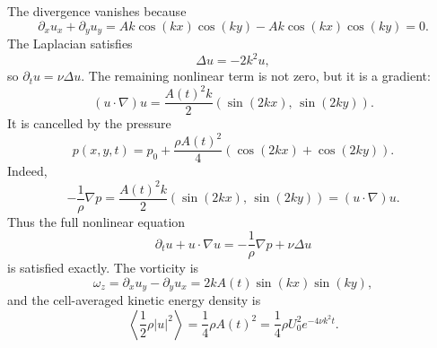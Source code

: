 The divergence vanishes because
\[
  \partial_xu_x+\partial_yu_y
  =
  A k\cos(kx)\cos(ky)
  -
  A k\cos(kx)\cos(ky)=0.
\]
The Laplacian satisfies
\[
  \Delta u=-2k^2u,
\]
so \(\partial_tu=\nu\Delta u\). The remaining nonlinear term is not zero, but
it is a gradient:
\[
  (u\cdot\nabla)u
  =
  \frac{A(t)^2k}{2}
  \left(\sin(2kx),\,\sin(2ky)\right).
\]
It is cancelled by the pressure
\[
  \boxed{
  p(x,y,t)=p_0+\frac{\rho A(t)^2}{4}
  \left(\cos(2kx)+\cos(2ky)\right).
  }
\]
Indeed,
\[
  -\frac1\rho\nabla p
  =
  \frac{A(t)^2k}{2}
  \left(\sin(2kx),\,\sin(2ky)\right)
  =
  (u\cdot\nabla)u.
\]
Thus the full nonlinear equation
\[
  \partial_tu+u\cdot\nabla u
  =
  -\frac1\rho\nabla p+\nu\Delta u
\]
is satisfied exactly. The vorticity is
\[
  \omega_z
  =
  \partial_xu_y-\partial_yu_x
  =
  2kA(t)\sin(kx)\sin(ky),
\]
and the cell-averaged kinetic energy density is
\[
  \left\langle \frac12\rho |u|^2\right\rangle
  =
  \frac14\rho A(t)^2
  =
  \frac14\rho U_0^2e^{-4\nu k^2t}.
\]

